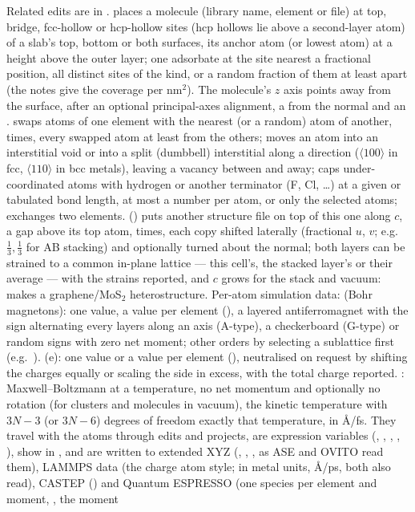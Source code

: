 Related edits are in .  places a molecule (library name, element or file) at top, bridge, fcc-hollow or hcp-hollow sites (hcp hollows lie above a second-layer atom) of a slab's top, bottom or both surfaces, its anchor atom (or lowest atom) at a height above the outer layer; one adsorbate at the site nearest a fractional position, all distinct sites of the kind, or a random fraction of them at least  apart (the notes give the coverage per nm$^2$). The molecule's $z$ axis points away from the surface, after an optional principal-axes alignment, a  from the normal and an .  swaps atoms of one element with the nearest (or a random) atom of another,  times, every swapped atom at least  from the others;  moves an atom into an interstitial void or into a split (dumbbell) interstitial along a direction ($\langle100\rangle$ in fcc, $\langle110\rangle$ in bcc metals), leaving a vacancy between  and  away;  caps under-coordinated atoms with hydrogen or another terminator (F, Cl, \ldots) at a given or tabulated bond length, at most a number per atom, or only the selected atoms;  exchanges two elements.  () puts another structure file on top of this one along $c$, a gap above its top atom,  times, each copy shifted laterally (fractional $u$, $v$; e.g.\ $\frac13,\frac13$ for AB stacking) and optionally turned about the normal; both layers can be strained to a common in-plane lattice --- this cell's, the stacked layer's or their average --- with the strains reported, and $c$ grows for the stack and vacuum:  makes a graphene/MoS$_2$ heterostructure. Per-atom simulation data:  (Bohr magnetons): one value, a value per element (), a layered antiferromagnet with the sign alternating every  layers along an axis (A-type), a checkerboard (G-type) or random signs with zero net moment; other orders by selecting a sublattice first (e.g.\ ).  (e): one value or a value per element (), neutralised on request by shifting the charges equally or scaling the side in excess, with the total charge reported. : Maxwell--Boltzmann at a temperature, no net momentum and optionally no rotation (for clusters and molecules in vacuum), the kinetic temperature with $3N-3$ (or $3N-6$) degrees of freedom exactly that temperature, in \AA/fs. They travel with the atoms through edits and projects, are expression variables (, , , , ), show in , and are written to extended XYZ (, , , as ASE and OVITO read them), LAMMPS data (the charge atom style;  in metal units, \AA/ps, both also read), CASTEP () and Quantum ESPRESSO (one species per element and moment, ,  the moment 